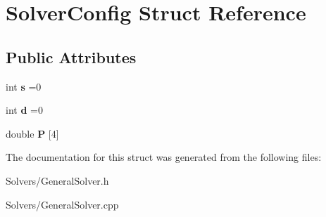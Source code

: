 \hypertarget{structSolverConfig}{}\section{Solver\+Config Struct Reference}
\label{structSolverConfig}
\subsection*{Public Attributes}
\begin{DoxyCompactItemize}
\item 
\mbox{\label{structSolverConfig_a48ff380d0d66cd704e86510b5cd3085f}} 
int {\bfseries s} =0
\item 
\mbox{\label{structSolverConfig_a36835c55d433deabaaeaf2135331cf03}} 
int {\bfseries d} =0
\item 
\mbox{\label{structSolverConfig_aeb7c8b3bf49aaa6e0f365de69808ae10}} 
double {\bfseries P} \mbox{[}4\mbox{]}
\end{DoxyCompactItemize}


The documentation for this struct was generated from the following files\+:\begin{DoxyCompactItemize}
\item 
Solvers/General\+Solver.\+h\item 
Solvers/General\+Solver.\+cpp\end{DoxyCompactItemize}
